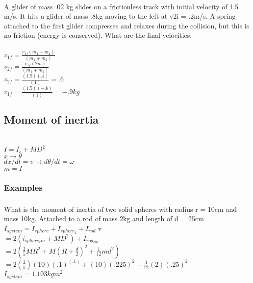 \documentclass{article}
\begin{document}
\hrulefill
\subsubsection{}
\hrulefill \\[15pt]

A glider of mass .02 kg slides on a frictionless track with initial velocity of 1.5 m/s. It hits a glider of mass .8kg moving to the left at v2i = .2m/s. A spring attached to the first glider compresses and relaxes during the collision, but this is no friction (energy is conserved). What are the final velocities. \\ [15pt]

 \\ [10pt]

$v_{1f} = \frac{v_{1f}(m_1-m_2)} {(m_1 + m_2)}$ \\ [15pt]

$v_{2f} = \frac{v_{1f}(2m)} {(m_1 + m_2)}$ \\ [15pt]

$v_{2f} = \frac{(1.5)(.4)} {(1)} = .6$\\ [15pt]

$v_{1f} = \frac{(1.5)(-.6)} {(1)} = -.9kg$\\ [15pt]

\pagebreak
\subsection{\huge Moment of inertia}
    \hrulefill \\
    $I = I_c + MD^2$ \\
    $x \rightarrow \theta$ \\
    $dx/dt = v \rightarrow d\theta/dt = \omega$ \\
    $m = I$ \\
    \hrulefill
        

    \subsubsection{\large \centering Examples}
    \hrulefill
    \centering
    \subsubsection{}
        What is the moment of inertia of two solid spheres with radius r = 10cm and mass 10kg. Attached to a rod of mass 2kg and length of d = 25cm
        \\ [15pt]
        $I_{system} = I_{sphere} + I_{sphere_2} + I_{rod}$ v \\[10pt]
        $= 2(i_{sphere_cm} + MD^2) + I_{rod_{cm}}$   \\[10pt]
        $ = 2(\frac{2}{5}MR^2 + M(R+\frac{d}{2})^2 + \frac{1}{12}md^2)$ \\ [10pt]
        $=2(\frac{2}{5})(10)(.1)^(.1) + (10)(.225)^2 + \frac{1}{12}(2)(.25)^2$ \\ [10pt]
        $I_{system} = 1.103kgm^2$ \\ [20pt]
\end{document}
